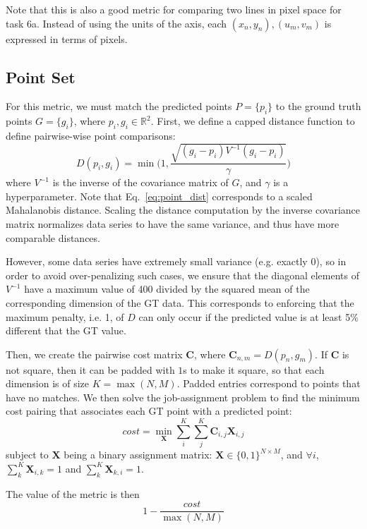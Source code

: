 \documentclass[a4paper,11pt]{scrartcl}
\begin{document}
Note that this is also a good metric for comparing two lines in pixel space for task 6a.
Instead of using the units of the axis, each $(x_n, y_n), (u_m, v_m)$ is expressed in terms of pixels.

\subsection{Point Set}

For this metric, we must match the predicted points $P = \{p_i\}$ to the ground truth points $G = \{g_i\}$, where $p_i, g_i \in \mathbb{R}^2$.
First, we define a capped distance function to define pairwise-wise point comparisons:
\begin{equation} \label{eq:point_dist}
D(p_i, g_i) = \min \Big(1, \frac{\sqrt{(g_i - p_i)V^{-1}(g_i - p_i)}}{\gamma} \Big)
\end{equation}
where $V^{-1}$ is the inverse of the covariance matrix of $G$, and $\gamma$ is a hyperparameter.
Note that Eq.~\ref{eq:point_dist} corresponds to a scaled Mahalanobis distance.
Scaling the distance computation by the inverse covariance matrix normalizes data series to have the same variance, and thus have more comparable distances.

However, some data series have extremely small variance (e.g. exactly 0), so in order to avoid over-penalizing such cases, we ensure that the diagonal elements of $V^{-1}$ have a maximum value of 400 divided by the squared mean of the corresponding dimension of the GT data.
This corresponds to enforcing that the maximum penalty, i.e. 1, of $D$ can only occur if the predicted value is at least 5\% different that the GT value.

Then, we create the pairwise cost matrix $\mathbf{C}$, where $\mathbf{C}_{n,m} = D(p_n,g_m)$.
If $\mathbf{C}$ is not square, then it can be padded with $1$s to make it square, so that each dimension is of size $K = \max(N,M)$.
Padded entries correspond to points that have no matches.
We then solve the job-assignment problem to find the minimum cost pairing that associates each GT point with a predicted point:
\begin{equation} \label{eq:assign}
cost = \min_{\mathbf{X}} \sum_i^K \sum_j^K \mathbf{C}_{i,j} \mathbf{X}_{i,j}
\end{equation}
subject to $\mathbf{X}$ being a binary assignment matrix: $\mathbf{X} \in \{0,1\}^{N \times M}$, and $\forall i$, $\sum_k^K \mathbf{X}_{i,k} = 1$ and $\sum_k^K \mathbf{X}_{k,i} = 1$.

The value of the metric is then 
\begin{equation} \label{eq:assign_cost}
1 - \frac{cost}{\max(N,M)}
\end{equation}
\end{document}
